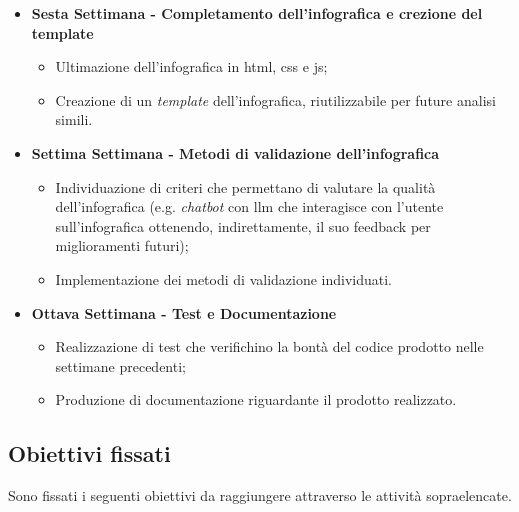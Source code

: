 \begin{itemize}
    \item \textbf{Sesta Settimana - Completamento dell'infografica e crezione del template} 
    \begin{itemize}
        \item Ultimazione dell'infografica in \gls{html}, \gls{css} e \gls{js};
        \item Creazione di un \emph{template} dell'infografica, riutilizzabile per future analisi simili.
    \end{itemize}
    \item \textbf{Settima Settimana - Metodi di validazione dell'infografica} 
    \begin{itemize}
        \item Individuazione di criteri che permettano di valutare la qualità dell'infografica (e.g. \textit{chatbot} con \gls{llm} che interagisce con l'utente sull'infografica ottenendo, indirettamente, il suo feedback per miglioramenti futuri);
        \item Implementazione dei metodi di validazione individuati.
    \end{itemize}
    \item \textbf{Ottava Settimana - Test e Documentazione} 
    \begin{itemize}
        \item Realizzazione di test che verifichino la bontà del codice prodotto nelle settimane precedenti;
        \item Produzione di documentazione riguardante il prodotto realizzato.
    \end{itemize}
\end{itemize}


\subsection{Obiettivi fissati}
Sono fissati i seguenti obiettivi da raggiungere attraverso le attività sopraelencate.

